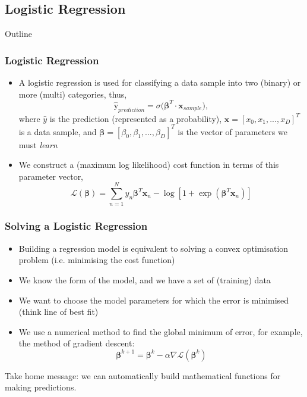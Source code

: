 \documentclass{beamer}
\begin{document}
\subsection{Logistic Regression}


\begin{frame}[noframenumbering]{Outline}
\tableofcontents[currentsubsection]
\end{frame}


\begin{frame}
\frametitle{Logistic Regression}
\begin{itemize}
\item A logistic regression is used for classifying a data sample into two (binary) or more (multi) categories, thus,
$$\hat{\text{y}}_{prediction} = \sigma\big(\boldsymbol\beta^{T} \cdot \boldsymbol{x}_{sample}\big),$$
where $\hat{y}$ is the prediction (represented as a probability), $\boldsymbol{x} = [x_0, x_1, ..., x_D]^T$ is a data sample, and $\boldsymbol\beta = [\beta_0, \beta_1, ..., \beta_D]^T$ is the vector of parameters we must \emph{learn}
\item We construct a (maximum log likelihood) cost function in terms of this parameter vector,
$$\mathcal{L}(\boldsymbol\beta) = \sum_{n=1}^N y_n\boldsymbol\beta^T\boldsymbol{x}_n - \log[1 + \exp(\boldsymbol\beta^T\boldsymbol{x}_n)]$$
\end{itemize}
\end{frame}


\begin{frame}
\frametitle{Solving a Logistic Regression}\begin{itemize}
\item Building a regression model is equivalent to solving a convex optimisation problem (i.e. minimising the cost function)
\item We know the form of the model, and we have a set of (training) data
\item We want to choose the model parameters for which the error is minimised (think line of best fit)
\item We use a numerical method to find the global minimum of error, for example, the method of gradient descent:
$$\boldsymbol\beta^{k+1} = \boldsymbol\beta^{k} - \alpha\nabla\mathcal{L}(\boldsymbol\beta^{k})$$
\end{itemize}
Take home message: we can automatically build mathematical functions for making predictions.
\end{frame}
\end{document}
